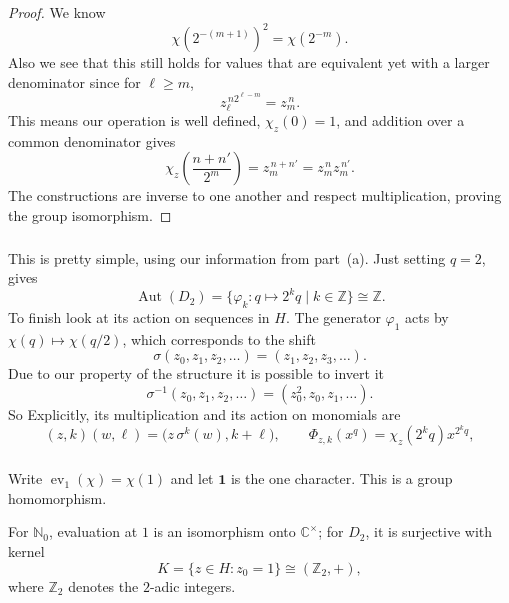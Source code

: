\documentclass[11pt]{scrartcl}
\begin{document}
\begin{soln}
    \begin{proof}
 
	We know	\[
        \chi(2^{-(m+1)})^2
        =\chi(2^{-m}).
        \]
        Also we see that this still holds for values that are equivalent 
		yet with a larger denominator since for $\ell\ge m$,
        \[
        z_\ell^{\,n2^{\ell-m}}=z_m^{\,n}.
        \]
       This means our operation is well defined, 
	   $\chi_z(0)=1$, and addition over a common denominator
        gives
        \[
        \chi_z\!\left(\frac{n+n'}{2^m}\right)
        =z_m^{\,n+n'}=z_m^{\,n}z_m^{\,n'}.
        \]
        The constructions are inverse to one another and respect
        multiplication, proving the group isomorphism.
    \end{proof}

    \subsubsection*{}

	This is pretty simple, using our information from part~(a). Just setting
	$q=2$, gives
    \[
    \operatorname{Aut}(D_2)
    =\{\varphi_k:q\mapsto2^kq\mid k\in\mathbb Z\}
    \cong\mathbb Z.
    \]
    To finish look at its action on sequences in $H$.
    The generator $\varphi_1$ acts by $\chi(q)\mapsto\chi(q/2)$,
    which corresponds to the shift
    \[
    \sigma(z_0,z_1,z_2,\ldots)=(z_1,z_2,z_3,\ldots).
    \]
	Due to our property of the structure it is possible to invert it 
	\[
    \sigma^{-1}(z_0,z_1,z_2,\ldots)
    =(z_0^2,z_0,z_1,\ldots).
    \]
    So
    Explicitly, its multiplication and its action on monomials are
    \[
    (z,k)(w,\ell)
    =\bigl(z\,\sigma^k(w),k+\ell\bigr),
    \qquad
    \Phi_{z,k}(x^q)=\chi_z(2^kq)x^{2^kq},
    \]
    \subsubsection*{}

    Write $\operatorname{ev}_1(\chi)=\chi(1)$ and let $\mathbf1$ is the one character.
	This is a group homomorphism.

    \begin{claim*}
        For $\mathbb N_0$, evaluation at $1$ is an isomorphism
        onto $\mathbb C^\times$; for $D_2$, it is surjective with
        kernel
        \[
        K=\{z\in H:z_0=1\}
        \cong(\mathbb Z_2,+),
        \]
        where $\mathbb Z_2$ denotes the $2$-adic integers.
    \end{claim*}


\end{soln}
\end{document}
